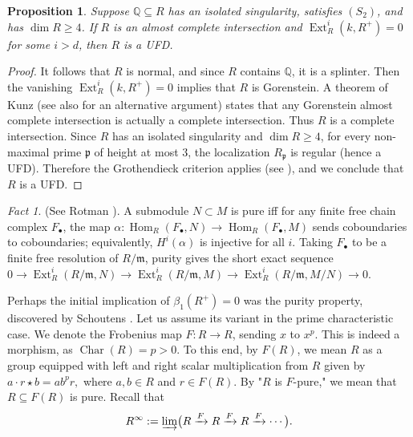 \documentclass[11pt,a4paper]{amsart}
\numberwithin{equation}{section}
\newtheorem{proposition}[theorem]{Proposition}
\theoremstyle{definition}
\theoremstyle{remark}
\newtheorem{fact}[theorem]{Fact}
\newcommand{\Char}{\operatorname{Char}}
\begin{document}
\begin{proposition}
	Suppose \(\mathbb{Q} \subseteq R\) has an isolated singularity, satisfies \((S_2)\), and has \(\dim R \ge 4\). If \(R\) is an almost complete intersection and
	\(
	\operatorname{Ext}_R^i(k, R^+) = 0
	\)
	for some \(i > d\), then \(R\) is a UFD.
\end{proposition}

\begin{proof}
	It follows that \(R\) is normal, and since \(R\) contains \(\mathbb{Q}\), it is a splinter. Then the vanishing \(\operatorname{Ext}_R^i(k, R^+) = 0\) implies that \(R\) is Gorenstein. A theorem of Kunz \cite{kunz} (see also \cite[5.13]{moh5} for an alternative argument) states that any Gorenstein almost complete intersection is actually a complete intersection. Thus \(R\) is a complete intersection.
	Since \(R\) has an isolated singularity and \(\dim R \ge 4\), for every non-maximal prime \(\mathfrak{p}\) of height at most \(3\), the localization \(R_{\mathfrak{p}}\) is regular (hence a UFD). Therefore the Grothendieck criterion applies (see \cite{sga2}), and we conclude that \(R\) is a UFD.
\end{proof}

\begin{fact}(See Rotman \cite{Rot}).
A submodule \(N \subset M\) is pure iff for any finite free chain complex \(F_\bullet\), the map 
$\alpha : \operatorname{Hom}_R(F_\bullet, N) \to \operatorname{Hom}_R(F_\bullet, M)$
sends coboundaries to coboundaries; equivalently, \(H^i(\alpha)\) is injective for all \(i\). 
Taking \(F_\bullet\) to be a finite free resolution of \(R/\mathfrak{m}\), purity gives the short exact sequence
$	0 \to \operatorname{Ext}_R^i(R/\mathfrak{m}, N) \to \operatorname{Ext}_R^i(R/\mathfrak{m}, M) \to \operatorname{Ext}_R^i(R/\mathfrak{m}, M/N) \to 0.$
\end{fact}
Perhaps the initial implication of \(\beta_1(R^+) = 0\) was the purity property, discovered by Schoutens \cite[Theorem 2.2]{sc1}. Let us assume its variant in the prime characteristic case. We denote the Frobenius map $F:R\to R$, sending $x$ to $x^p$. This is indeed a morphism, as $\Char(R)=p>0$.
To this end, by \(F(R)\), we mean \(R\) as a group equipped with left and right scalar multiplication from \(R\) given by
\(
a \cdot r \star b = ab^p r,
\)
where \(a, b \in R\) and \(r \in F(R)\). By "\(R\) is \(F\)-pure," we mean that \(R \subseteq F(R)\) is pure. Recall that
\[
R^\infty := \varinjlim \bigl( R \xrightarrow{F} R \xrightarrow{F} R \xrightarrow{F} \cdots \bigr).
\]
\end{document}

